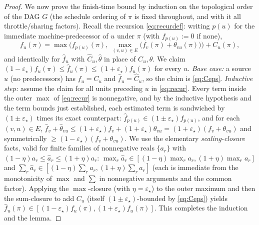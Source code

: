 \documentclass{amsart}
\theoremstyle{definition}
\begin{document}
\begin{proof}
We now prove the finish-time bound by induction on the topological order of the
DAG $G$ (the schedule ordering of $\pi$ is fixed throughout, and with it all
throttle/sharing factors). Recall the recursion \eqref{eq:recurdef}: writing
$p(u)$ for the immediate machine-predecessor of $u$ under $\pi$ (with
$f_{p(u)}:=0$ if none),
\begin{equation}\label{eq:recur}
f_u(\pi)=\max\Big(f_{p(u)}(\pi),\ \max_{(v,u)\in E}\big(f_v(\pi)+\theta_{vu}(\pi)\big)\Big)+C_u(\pi),
\end{equation}
and identically for $\widehat f_u$ with $\widehat C_u,\widehat\theta$ in place of
$C_u,\theta$. We claim $(1-\varepsilon_\star)f_u(\pi)\le\widehat f_u(\pi)\le
(1+\varepsilon_\star)f_u(\pi)$ for every $u$. \emph{Base case:} a source $u$ (no
predecessors) has $f_u=C_u$ and $\widehat f_u=\widehat C_u$, so the claim is
\eqref{eq:Ceps}. \emph{Inductive step:} assume the claim for all units preceding
$u$ in \eqref{eq:recur}. Every term inside the outer $\max$ of \eqref{eq:recur}
is nonnegative, and by the inductive hypothesis and the term bounds just
established, each estimated term is sandwiched by $(1\pm\varepsilon_\star)$ times
its exact counterpart:
$\widehat f_{p(u)}\in(1\pm\varepsilon_\star)f_{p(u)}$, and for each $(v,u)\in E$,
$\widehat f_v+\widehat\theta_{vu}\le(1+\varepsilon_\star)f_v+(1+\varepsilon_\star)\theta_{vu}
=(1+\varepsilon_\star)(f_v+\theta_{vu})$ and symmetrically
$\ge(1-\varepsilon_\star)(f_v+\theta_{vu})$.
We use the elementary \emph{scaling-closure} facts, valid for finite families of
nonnegative reals $\{a_r\}$ with $(1-\eta)a_r\le\hat a_r\le(1+\eta)a_r$:
$\max_r\hat a_r\in[(1-\eta)\max_r a_r,(1+\eta)\max_r a_r]$ and
$\sum_r\hat a_r\in[(1-\eta)\sum_r a_r,(1+\eta)\sum_r a_r]$ (each is immediate
from the monotonicity of $\max$ and $\sum$ in nonnegative arguments and the
common factor). Applying the $\max$-closure (with $\eta=\varepsilon_\star$) to
the outer maximum and then the sum-closure to add $C_u$ (itself
$(1\pm\varepsilon_\star)$-bounded by \eqref{eq:Ceps}) yields
$\widehat f_u(\pi)\in[(1-\varepsilon_\star)f_u(\pi),(1+\varepsilon_\star)f_u(\pi)]$.
This completes the induction and the lemma.
\end{proof}
\end{document}
